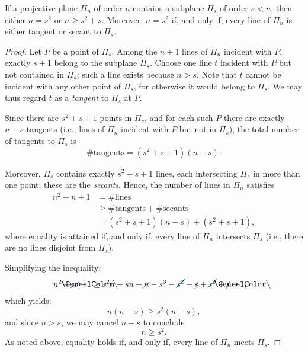 \begin{thm}{\upshape [Bruck 1965]}\label{thm:bruck}
    If a projective plane\/ $\Pi_n$ of order\/ $n$ contains a subplane \/$\Pi_s$ of order\/ $s<n$, then either\/ $n=s^2$ or\/ $n\ge s^2+s$. Moreover, $n=s^2$ if, and only if, every line of $\Pi_n$ is either tangent or secant to $\Pi_s$.
\end{thm}

\begin{proof}
    Let $P$ be a point of $\Pi_s$. Among the $n+1$ lines of $\Pi_n$ incident with $P$, exactly $s+1$ belong to the subplane $\Pi_s$. Choose one line $t$ incident with $P$ but not contained in $\Pi_s$; such a line exists because $n > s$. Note that $t$ cannot be incident with any other point of $\Pi_s$, for otherwise it would belong to $\Pi_s$. We may thus regard $t$ as a \emph{tangent} to $\Pi_s$ at $P$.
    
    Since there are $s^2 + s + 1$ points in $\Pi_s$, and for each such $P$ there are exactly $n - s$ tangents (i.e., lines of $\Pi_n$ incident with $P$ but not in $\Pi_s$), the total number of tangents to $\Pi_s$ is
    \[
        \#\mathrm{tangents} = (s^2 + s + 1)(n - s).
    \]
    
    Moreover, $\Pi_s$ contains exactly $s^2 + s + 1$ lines, each intersecting $\Pi_s$ in more than one point; these are the \emph{secants}. Hence, the number of lines in $\Pi_n$ satisfies
    \begin{align*}
        n^2 + n + 1 &= \#\text{lines} \\
                    &\ge \#\text{tangents} + \#\text{secants} \\
                    &= (s^2 + s + 1)(n - s) + (s^2 + s + 1),
    \end{align*}
    where equality is attained if, and only if, every line of $\Pi_n$ intersects $\Pi_s$ (i.e., there are no lines disjoint from $\Pi_s$).
    
    Simplifying the inequality:
    \begin{align*}
        n^2+\Ccancel[Violet]n+\bcancel1
            &\ge s^2n + sn + \Ccancel[Violet]n - s^3 - \Ccancel[teal]{s^2}
                - \Ccancel[BrickRed]s + \Ccancel[teal]{s^2}
                + \Ccancel[BrickRed]s + \bcancel1,
    \end{align*}
    which yields:
    \[
        n(n - s) \ge s^2(n - s),
    \]
    and since $n > s$, we may cancel $n - s$ to conclude
    \[
        n \ge s^2.
    \]
    As noted above, equality holds if, and only if, every line of $\Pi_n$ meets $\Pi_s$.


\end{proof}
